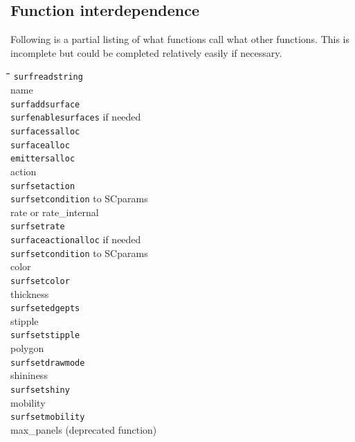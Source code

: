 \documentclass {scrbook}
\newcommand {\ttt} {\texttt}
\begin{document}
\subsection{Function interdependence}

Following is a partial listing of what functions call what other functions. This is incomplete but could be completed relatively easily if necessary.

\begin{tabbing}
\hspace{0.25in}\=\hspace{0.25in}\=\hspace{0.25in}\=\hspace{0.25in}\=\hspace{0.25in}\=\hspace{0.25in}\=\kill
\ttt{surfreadstring}\\
\>name\\
\>\>\ttt{surfaddsurface}\\
\>\>\>\ttt{surfenablesurfaces} if needed\\
\>\>\>\>\ttt{surfacessalloc}\\
\>\>\>\>\>\ttt{surfacealloc}\\
\>\>\>\>\>\>\ttt{emittersalloc}\\
\>action\\
\>\>\ttt{surfsetaction}\\
\>\>\>\ttt{surfsetcondition} to SCparams\\
\>rate or rate\_internal\\
\>\>\ttt{surfsetrate}\\
\>\>\>\ttt{surfaceactionalloc} if needed\\
\>\>\>\ttt{surfsetcondition} to SCparams\\
\>color\\
\>\>\ttt{surfsetcolor}\\
\>thickness\\
\>\>\ttt{surfsetedgepts}\\
\>stipple\\
\>\>\ttt{surfsetstipple}\\
\>polygon\\
\>\>\ttt{surfsetdrawmode}\\
\>shininess\\
\>\>\ttt{surfsetshiny}\\
\>mobility\\
\>\>\ttt{surfsetmobility}\\
\>max\_panels (deprecated function)\\

\end{tabbing}
\end{document}
